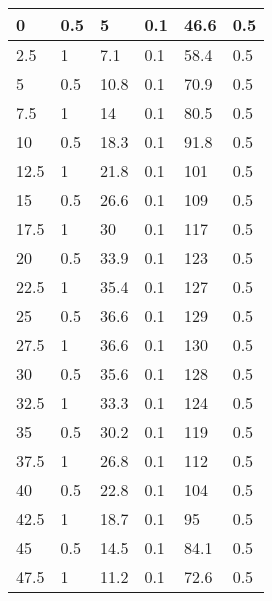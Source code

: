 \begin{center}
\begin{longtable}{|l|l|l|l|l|l|}
0     & 0.5         & 5               & 0.1         & 46.6          & 0.5           \\ \hline
2.5   & 1           & 7.1             & 0.1         & 58.4          & 0.5           \\ \hline
5     & 0.5         & 10.8            & 0.1         & 70.9          & 0.5           \\ \hline
7.5   & 1           & 14              & 0.1         & 80.5          & 0.5           \\ \hline
10    & 0.5         & 18.3            & 0.1         & 91.8          & 0.5           \\ \hline
12.5  & 1           & 21.8            & 0.1         & 101           & 0.5           \\ \hline
15    & 0.5         & 26.6            & 0.1         & 109           & 0.5           \\ \hline
17.5  & 1           & 30              & 0.1         & 117           & 0.5           \\ \hline
20    & 0.5         & 33.9            & 0.1         & 123           & 0.5           \\ \hline
22.5  & 1           & 35.4            & 0.1         & 127           & 0.5           \\ \hline
25    & 0.5         & 36.6            & 0.1         & 129           & 0.5           \\ \hline
27.5  & 1           & 36.6            & 0.1         & 130           & 0.5           \\ \hline
30    & 0.5         & 35.6            & 0.1         & 128           & 0.5           \\ \hline
32.5  & 1           & 33.3            & 0.1         & 124           & 0.5           \\ \hline
35    & 0.5         & 30.2            & 0.1         & 119           & 0.5           \\ \hline
37.5  & 1           & 26.8            & 0.1         & 112           & 0.5           \\ \hline
40    & 0.5         & 22.8            & 0.1         & 104           & 0.5           \\ \hline
42.5  & 1           & 18.7            & 0.1         & 95            & 0.5           \\ \hline
45    & 0.5         & 14.5            & 0.1         & 84.1          & 0.5           \\ \hline
47.5  & 1           & 11.2            & 0.1         & 72.6          & 0.5           \\ \hline

\end{longtable}
\end{center}
